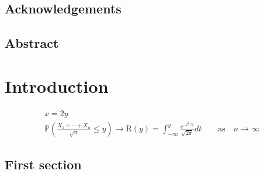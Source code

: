 \documentclass[english]{ist-thesis}
\begin{document}
\makecover

\section*{Acknowledgements}

\cleardoublepage

\section*{Abstract}

\cleardoublepage

{\tableofcontents}

\cleardoublepage

\chapter{Introduction}

\begin{gather*}
	x = 2y \\
	\mathbb{P}\left(\frac{X_1 + \cdots + X_n}{\sqrt{n}} \leq y\right) \rightarrow \mathrm{R}(y) = \int_{-\infty}^{y} \frac{e^{-t^2/2}}{\sqrt{2\pi}}dt \qquad \mathrm{as} \quad n \rightarrow \infty
\end{gather*}

\section{First section}

\lipsum
\end{document}
